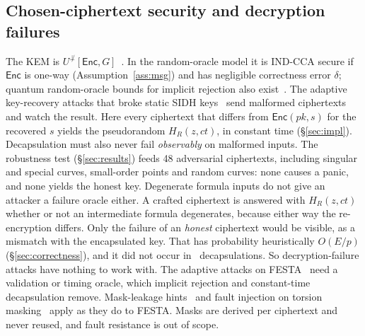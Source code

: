 \subsection{Chosen-ciphertext security and decryption failures}\label{sec:cca}
The KEM is $U^{\not\perp}[\textsf{Enc},G]$~\cite{HHK17}. In the random-oracle
model it is IND-CCA secure if $\textsf{Enc}$ is one-way
(Assumption~\ref{ass:msg}) and has negligible correctness error $\delta$;
quantum random-oracle bounds for implicit rejection also
exist~\cite{BHHHP19}. The adaptive key-recovery attacks that broke static
SIDH keys~\cite{GPST16} send malformed ciphertexts and watch the result.
Here every ciphertext that differs from $\textsf{Enc}(\mathit{pk},s)$ for the
recovered $s$ yields the pseudorandom $H_R(z,\mathit{ct})$, in constant time
(\S\ref{sec:impl}). Decapsulation must also never fail \emph{observably} on
malformed inputs. The robustness test (\S\ref{sec:results}) feeds 48
adversarial ciphertexts, including singular and special curves,
small-order points and random curves: none causes a panic, and none yields
the honest key. Degenerate formula inputs do not give an attacker a failure oracle either.
A crafted ciphertext is answered with $H_R(z,\mathit{ct})$ whether or not
an intermediate formula degenerates, because either way the re-encryption
differs. Only the failure of an \emph{honest} ciphertext would be visible,
as a mismatch with the encapsulated key. That has probability
heuristically $O(E/p)$ (\S\ref{sec:correctness}), and it did not occur in
\FailTotalTrials\ decapsulations. So decryption-failure attacks have nothing
to work with. The adaptive attacks on FESTA~\cite{MO23} need a
validation or timing oracle, which implicit rejection and constant-time
decapsulation remove. Mask-leakage hints~\cite{DIKM25} and fault
injection on torsion masking~\cite{GLM26} apply as they do to FESTA. Masks
are derived per ciphertext and never reused, and fault resistance is out of
scope.

